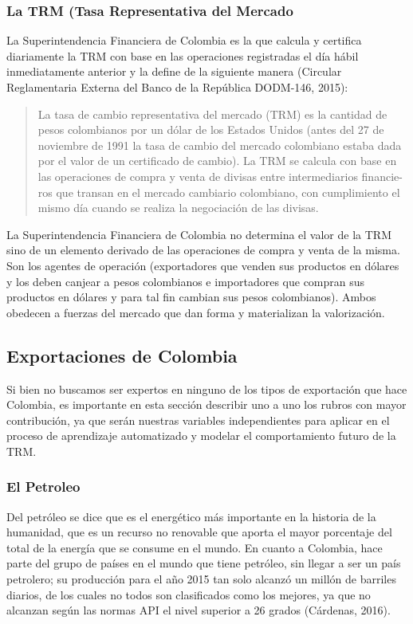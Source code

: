 \documentclass[letterpaper, spanish, 11pt]{report}
\begin{document}
\subsubsection{La TRM (Tasa Representativa del Mercado}
La Superintendencia Financiera de Colombia es la que calcula y certifica diariamente la TRM con base en las operaciones registradas el día hábil inmediatamente  anterior  y  la  define  de  la  siguiente  manera  (Circular  Reglamentaria Externa del Banco de la República DODM-146, 2015):

	\begin{quote}La  tasa  de  cambio  representativa  del  mercado  (TRM)  es  la  cantidad de pesos colombianos por un dólar de los Estados Unidos (antes del 27 de noviembre de 1991 la tasa de cambio del mercado colombiano estaba dada por el valor de un certificado de cambio). La TRM se calcula con base en las operaciones de compra y venta de divisas entre intermediarios financie-ros que transan en el mercado cambiario colombiano, con cumplimiento el mismo día cuando se realiza la negociación de las divisas.
	\end{quote}

La Superintendencia Financiera de Colombia no determina el valor de la TRM sino de un elemento derivado de las operaciones de compra y venta de la misma. Son los agentes de operación (exportadores que venden sus productos en dólares y los deben canjear a pesos colombianos e importadores que compran sus productos en dólares y para tal fin cambian sus pesos colombianos). Ambos obedecen a fuerzas del mercado que dan forma y materializan la valorización.

\subsection{Exportaciones de Colombia}
Si bien no buscamos ser expertos en ninguno de los tipos de exportación que hace Colombia, es importante en esta sección describir uno a uno los rubros con mayor contribución, ya que serán nuestras variables independientes para aplicar en el proceso de aprendizaje automatizado y modelar el comportamiento futuro de la TRM. 

\subsubsection{El Petroleo}
Del petróleo se dice que es el energético más importante en la historia de la humanidad, que es un recurso no renovable que aporta el mayor porcentaje del total de la energía que se consume en el mundo. En cuanto a Colombia, hace parte del grupo de países en el mundo que tiene petróleo, sin llegar a ser un país petrolero; su producción para el año 2015 tan solo alcanzó un millón de barriles diarios, de los cuales no todos son clasificados como los mejores, ya que no alcanzan según las normas API el nivel superior a 26 grados (Cárdenas, 2016). 
\end{document}
